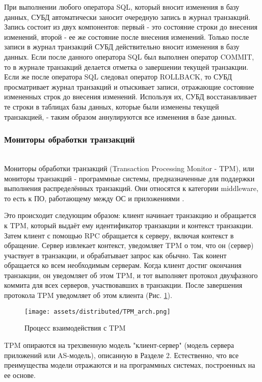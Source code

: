 При выполнении любого оператора SQL, который вносит изменения в базу данных, СУБД автоматически заносит
очередную запись в журнал транзакций. Запись состоит из двух компонентов: первый - это состояние строки до
внесения изменений, второй - ее же состояние после внесения изменений. Только после записи в журнал транзакций
СУБД действительно вносит изменения в базу данных. Если после данного оператора SQL был выполнен оператор
COMMIT, то в журнале транзакций делается отметка о завершении текущей транзакции. Если же после
оператора SQL следовал оператор ROLLBACK, то СУБД просматривает журнал транзакций и отыскивает записи,
отражающие состояние измененных строк до внесения изменений. Используя их, СУБД восстанавливает те
строки в таблицах базы данных, которые были изменены текущей транзакцией, - таким образом
аннулируются все изменения в базе данных.

\subsubsection{Мониторы обработки транзакций}~\\
Мониторы обработки транзакций (Transaction Processing Monitor - TPM), или мониторы
транзакций - программные системы, предназначенные для поддержки выполнения распределённых транзакций.
Они относятся к категории middleware, то есть к ПО, работающему между ОС и приложениями \autocite{TransactionMonitors}.

Это происходит следующим образом: клиент начинает транзакцию и обращается к TPM, который выдаёт ему
идентификатор транзакции и контекст транзакции. Затем клиент с помощью RPC обращается к серверу,
включая контекст в обращение. Сервер извлекает контекст, уведомляет TPM о том, что он (сервер) участвует
в транзакции, и обрабатывает запрос как обычно. Так коиент обращается ко всем необходимым серверам. 
Когда клиент достиг окончания транзакции, он уведомляет об этом TPM, и тот выполняет протокол двухфазного коммита
для всех серверов, участвовавших в транзакции. После завершения протокола TPM уведомляет об этом клиента (Рис. \ref{tpm_process}). \autocite{WebServices}

\begin{figure}[h!]
    \centering
    \texttt{[image: assets/distributed/TPM\_arch.png]}
    \caption{Процесс взаимодействия с TPM}
	\label{tpm_process}
\end{figure}

TPM опираются на трехзвенную модель "клиент-сервер" (модель сервера приложений или AS-модель), описанную в Разделе 2.
Естественно, что все преимущества модели отражаются и на программных системах, построенных на ее основе.


